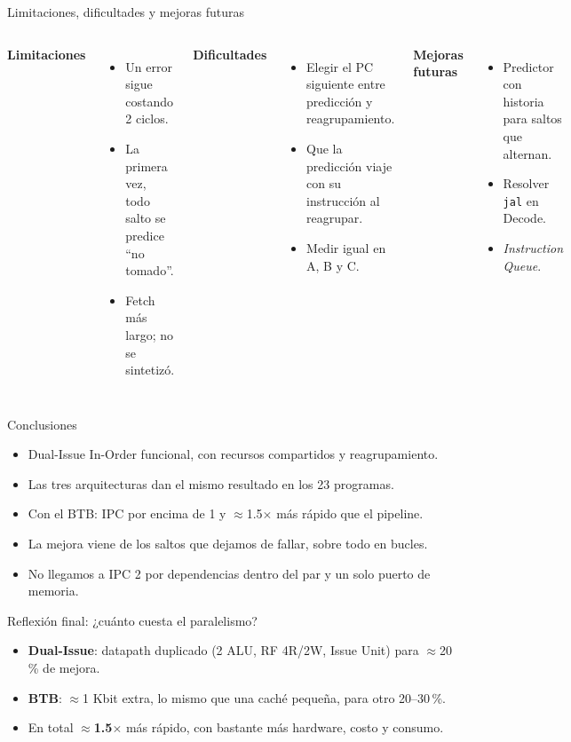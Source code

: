 \documentclass[aspectratio=169,10pt]{beamer}
\begin{document}
\begin{frame}{Limitaciones, dificultades y mejoras futuras}
  \begin{columns}[T]
    \textbf{Limitaciones}
    \begin{itemize}\small
      \item Un error sigue costando 2 ciclos.
      \item La primera vez, todo salto se predice ``no tomado''.
      \item Fetch más largo; no se sintetizó.
    \end{itemize}
    \textbf{Dificultades}
    \begin{itemize}\small
      \item Elegir el PC siguiente entre predicción y reagrupamiento.
      \item Que la predicción viaje con su instrucción al reagrupar.
      \item Medir igual en A, B y C.
    \end{itemize}
    \textbf{Mejoras futuras}
    \begin{itemize}\small
      \item Predictor con historia para saltos que alternan.
      \item Resolver \texttt{jal} en Decode.
      \item \emph{Instruction Queue}.
    \end{itemize}
  \end{columns}
\end{frame}

\begin{frame}{Conclusiones}
  \begin{itemize}
    \item Dual-Issue In-Order funcional, con recursos compartidos y reagrupamiento.
    \item Las tres arquitecturas dan el mismo resultado en los 23 programas.
    \item Con el BTB: IPC por encima de 1 y $\approx$1.5$\times$ más rápido que el pipeline.
    \item La mejora viene de los saltos que dejamos de fallar, sobre todo en bucles.
    \item No llegamos a IPC 2 por dependencias dentro del par y un solo puerto de memoria.
  \end{itemize}
\end{frame}

\begin{frame}{Reflexión final: ¿cuánto cuesta el paralelismo?}
  \begin{itemize}
    \item \textbf{Dual-Issue}: datapath duplicado (2 ALU, RF 4R/2W, Issue Unit) para $\approx$20\,\% de mejora.
    \item \textbf{BTB}: $\approx$1 Kbit extra, lo mismo que una caché pequeña, para otro 20--30\,\%.
    \item En total $\approx$\textbf{1.5$\times$} más rápido, con bastante más hardware, costo y consumo.
  \end{itemize}
\end{frame}
\end{document}

